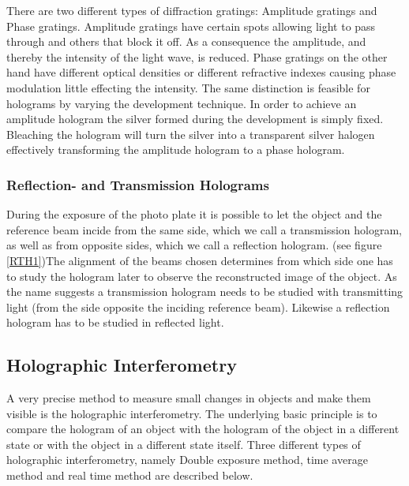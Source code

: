 There are two different types of diffraction gratings: Amplitude gratings and Phase gratings. Amplitude gratings have certain spots allowing light to pass through and others that block it off. As a consequence the amplitude, and thereby the intensity of the light wave, is reduced. Phase gratings on the other hand have different optical densities or different refractive indexes causing phase modulation little effecting the intensity.
The same distinction is feasible for holograms by varying the development technique. In order to achieve an amplitude hologram the silver formed during the development is simply fixed. Bleaching the hologram will turn the silver into a transparent silver halogen effectively transforming the amplitude hologram to a phase hologram. 

\subsubsection{Reflection- and Transmission Holograms \label{ReflTrans}}

During the exposure of the photo plate it is possible to let the object and the reference beam incide from the same side, which we call a transmission hologram, as well as from opposite sides, which we call a reflection hologram. (see figure \ref{RTH1})The alignment of the beams chosen determines from which side one has to study the hologram later to observe the reconstructed image of the object.
As the name suggests a transmission hologram needs to be studied with transmitting light (from the side opposite the inciding reference beam). Likewise a reflection hologram has to be studied in reflected light.



\subsection{Holographic Interferometry}

A very precise method to measure small changes in objects and make them visible is the holographic interferometry. The underlying basic principle is to compare the hologram of an object with the hologram of the object in a different state or with the object in a different state itself. Three different types of holographic interferometry, namely Double exposure method, time average method and real time method are described below.

